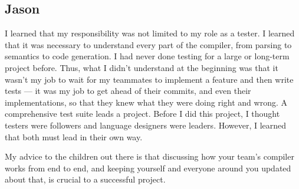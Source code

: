 \subsection{Jason}

I learned that my responsibility was not limited to my role as a tester. I learned that it was necessary to understand every part of the compiler, from parsing to semantics to code generation.
I had never done testing for a large or long-term project before. Thus, what I didn't understand at the beginning was that it wasn't my job to wait for my teammates to implement a feature and then write tests — it was my job to get ahead of their commits, and even their implementations, so that they knew what they were doing right and wrong. A comprehensive test suite leads a project.
Before I did this project, I thought testers were followers and language designers were leaders. However, I learned that both must lead in their own way.

My advice to the children out there is that discussing how your team's compiler works from end to end, and keeping yourself and everyone around you updated about that, is crucial to a successful project.